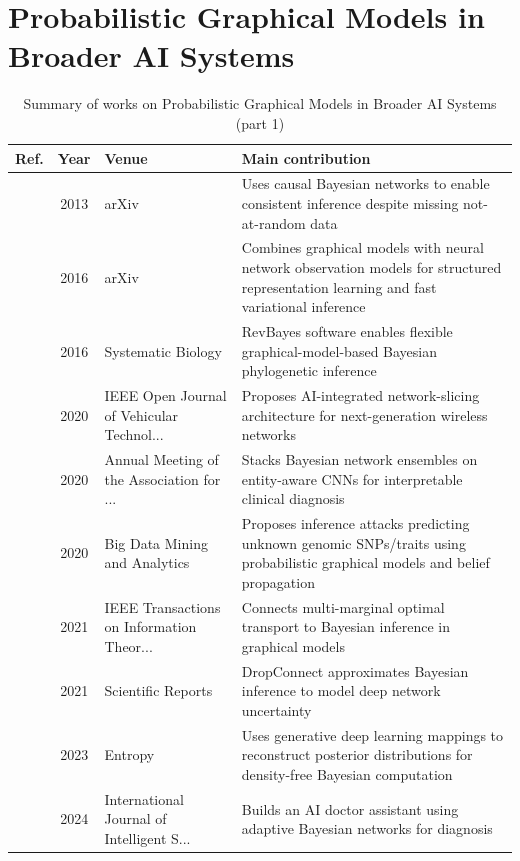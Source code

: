 \section{Probabilistic Graphical Models in Broader AI Systems}\label{sec:theme1}
\begin{table}[!t]
\centering
\renewcommand{\arraystretch}{1.2}
\caption{Summary of works on Probabilistic Graphical Models in Broader AI Systems (part 1)}\label{tab:theme1}
\begin{tabularx}{\textwidth}{@{}l c p{3.6cm} X@{}}
\toprule
\textbf{Ref.} & \textbf{Year} & \textbf{Venue} & \textbf{Main contribution} \\
\midrule
\cite{mohan2013graphical} & 2013 & arXiv & Uses causal Bayesian networks to enable consistent inference despite missing not-at-random data \\
\cite{j2016composing} & 2016 & arXiv & Combines graphical models with neural network observation models for structured representation learning and fast variational inference \\
\cite{hohna2016revbayes} & 2016 & Systematic Biology & RevBayes software enables flexible graphical-model-based Bayesian phylogenetic inference \\
\cite{shen2020assisted} & 2020 & IEEE Open Journal of Vehicular Technol... & Proposes AI-integrated network-slicing architecture for next-generation wireless networks \\
\cite{chen2020interpretable} & 2020 & Annual Meeting of the Association for ... & Stacks Bayesian network ensembles on entity-aware CNNs for interpretable clinical diagnosis \\
\cite{he2020inference} & 2020 & Big Data Mining and Analytics & Proposes inference attacks predicting unknown genomic SNPs/traits using probabilistic graphical models and belief propagation \\
\cite{haasler2021multi} & 2021 & IEEE Transactions on Information Theor... & Connects multi-marginal optimal transport to Bayesian inference in graphical models \\
\cite{mobiny2021dropconnect} & 2021 & Scientific Reports & DropConnect approximates Bayesian inference to model deep network uncertainty \\
\cite{polson2023generative} & 2023 & Entropy & Uses generative deep learning mappings to reconstruct posterior distributions for density-free Bayesian computation \\
\cite{selvaraj2024artificial} & 2024 & International Journal of Intelligent S... & Builds an AI doctor assistant using adaptive Bayesian networks for diagnosis \\

\end{tabularx}
\end{table}
